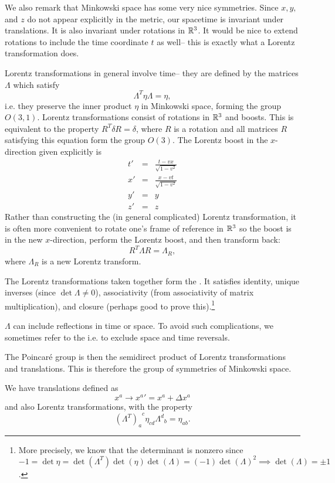 We also remark that Minkowski space has some very nice symmetries. Since $x,y,$ and $z$ do not appear explicitly in the metric, our spacetime is invariant under translations. It is also invariant under rotations in $\mathbb{R}^3$. It would be nice to extend rotations to include the time coordinate $t$ as well-- this is exactly what a Lorentz transformation does.

Lorentz transformations in general involve time-- they are defined by the matrices $\Lambda$ which satisfy
$$\Lambda^T \eta \Lambda= \eta,$$
i.e. they preserve the inner product $\eta$ in Minkowski space, forming the group $O(3,1)$. Lorentz transformations consist of rotations in $\mathbb{R}^3$ and boosts. This is equivalent to the property $R^T \delta R=\delta$, where $R$ is a rotation and all matrices $R$ satisfying this equation form the group $O(3)$.
The Lorentz boost in the $x$-direction given explicitly is
\begin{eqnarray*}
t'&=&\frac{t-vx}{\sqrt{1-v^2}}\\
x'&=&\frac{x-vt}{\sqrt{1-v^2}}\\
y'&=&y\\
z'&=&z
\end{eqnarray*}
Rather than constructing the (in general complicated) Lorentz transformation, it is often more convenient to rotate one's frame of reference in $\mathbb{R}^3$ so the boost is in the new $x$-direction, perform the Lorentz boost, and then transform back:
$$R^T \Lambda R= \Lambda_R,$$
where $\Lambda_R$ is a new Lorentz transform.

\begin{defn}
The Lorentz transformations taken together form the . It satisfies identity, unique inverses (since $\det\Lambda \neq 0$), associativity (from associativity of matrix multiplication), and closure (perhaps good to prove this).\footnote{More precisely, we know that the determinant is nonzero since $-1=\det{\eta}=\det(\Lambda^T)\det(\eta)\det(\Lambda)=(-1)\det(\Lambda)^2\implies \det(\Lambda)=\pm 1$.}
\end{defn}

$\Lambda$ can include reflections in time or space. To avoid such complications, we sometimes refer to the  i.e. to exclude space and time reversals. 
\begin{defn}
The Poincar\'e group is then the semidirect product of Lorentz transformations and translations. This is therefore the group of symmetries of Minkowski space.
\end{defn}
We have translations defined as
$$x^a\to {x^a}'=x^a+\Delta x^a$$
and also Lorentz transformations, with the property
$${(\Lambda^T)_a}^c \eta_{cd} {\Lambda^d}_b=\eta_{ab}.$$



